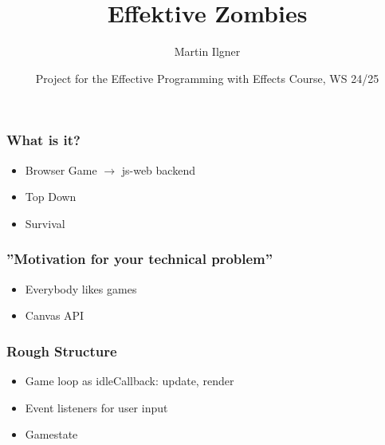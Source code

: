 \documentclass{beamer}
\title{Effektive Zombies}
\author{Martin Ilgner}
\institute{University of Tübingen}
\date{Project for the Effective Programming with Effects Course, WS 24/25}
\begin{document}
	
	
	
	\frame{\titlepage}
	
	\begin{frame}
		\frametitle{What is it?}
		\begin{Large}
		\begin{itemize}
			\setlength{\itemsep}{.5em}
			\item Browser Game $\rightarrow$ js-web backend
			\item Top Down 
			\item Survival
		\end{itemize}
		\end{Large}
	\end{frame}
	
	\begin{frame}
		\frametitle{''Motivation for your technical problem''}
		\begin{Large}
		\begin{itemize}
			\setlength{\itemsep}{1em}
			\item Everybody likes games
			\item Canvas API
		\end{itemize}
		\end{Large}
	\end{frame}
	
	\begin{frame}
		\frametitle{Rough Structure}
		\begin{Large}
		\begin{itemize}
			\setlength{\itemsep}{.5em}
			\item Game loop as idleCallback: update, render
			\item Event listeners for user input
			\item Gamestate
		\end{itemize}
		\end{Large}
	\end{frame}
	
\end{document}
